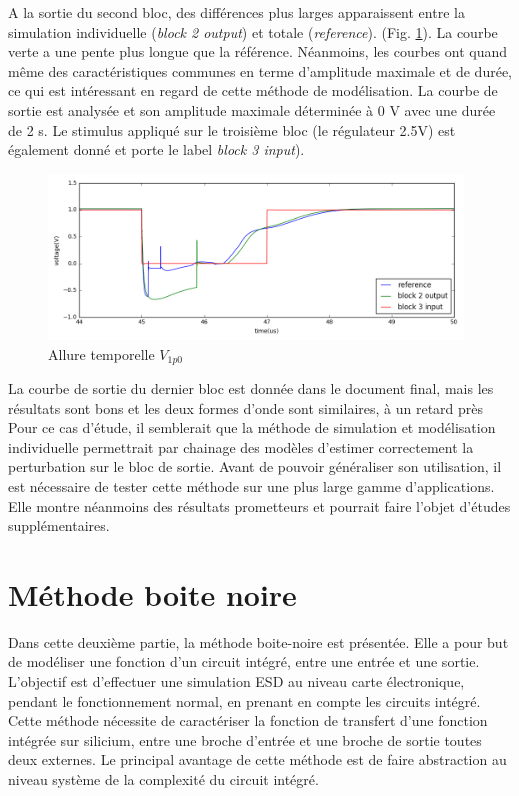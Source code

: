 A la sortie du second bloc, des différences plus larges apparaissent entre la simulation individuelle (\textit{block 2 output}) et totale (\textit{reference}). (Fig. \ref{fig:sim-compare-block2}).
La courbe verte a une pente plus longue que la référence.
Néanmoins, les courbes ont quand même des caractéristiques communes en terme d'amplitude maximale et de durée, ce qui est intéressant en regard de cette méthode de modélisation.
La courbe de sortie est analysée et son amplitude maximale déterminée à 0 V avec une durée de 2 \textmugreek{}s.
Le stimulus appliqué sur le troisième bloc (le régulateur 2.5V) est également donné et porte le label \textit{block 3 input}).

\begin{figure}[!h]
  \centering
  \includegraphics[width=0.98\textwidth]{src/1/figures/simulation_comparison_block2.png}
  \caption{Allure temporelle $V_{1p0}$}
  \label{fig:sim-compare-block2}
\end{figure}

La courbe de sortie du dernier bloc est donnée dans le document final, mais les résultats sont bons et les deux formes d'onde sont similaires, à un retard près
Pour ce cas d'étude, il semblerait que la méthode de simulation et modélisation individuelle permettrait par chainage des modèles d'estimer correctement la perturbation sur le bloc de sortie.
Avant de pouvoir généraliser son utilisation, il est nécessaire de tester cette méthode sur une plus large gamme d'applications.
Elle montre néanmoins des résultats prometteurs et pourrait faire l'objet d'études supplémentaires.

\section{Méthode boite noire}

Dans cette deuxième partie, la méthode boite-noire est présentée.
Elle a pour but de modéliser une fonction d'un circuit intégré, entre une entrée et une sortie.
L'objectif est d'effectuer une simulation ESD au niveau carte électronique, pendant le fonctionnement normal, en prenant en compte les circuits intégré.
Cette méthode nécessite de caractériser la fonction de transfert d'une fonction intégrée sur silicium, entre une broche d'entrée et une broche de sortie toutes deux externes.
Le principal avantage de cette méthode est de faire abstraction au niveau système de la complexité du circuit intégré.

